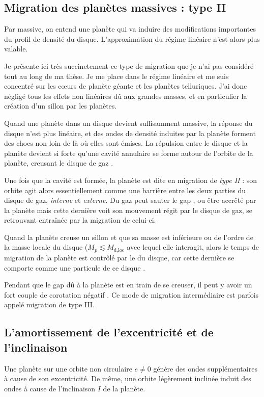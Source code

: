 \subsection{Migration des planètes massives : type II}
Par massive, on entend une planète qui va induire des modifications importantes du profil de densité du disque. L'approximation du régime linéaire n'est alors plus valable. 

Je présente ici très succinctement ce type de migration que je n'ai pas considéré tout au long de ma thèse. Je me place dans le régime linéaire et me suis concentré sur les cœurs de planète géante et les planètes telluriques. J'ai donc négligé tous les effets non linéaires dû aux grandes masses, et en particulier la création d'un sillon par les planètes.

\bigskip

Quand une planète dans un disque devient suffisamment massive, la réponse du disque n'est plus linéaire, et des ondes de densité induites par la planète forment des chocs non loin de là où elles sont émises. La répulsion entre le disque et la planète devient si forte qu'une cavité annulaire se forme autour de l'orbite de la planète, creusant le disque de gaz \citep{lin1986tidal}.

Une fois que la cavité est formée, la planète est dite en migration de \emph{type II} : son orbite agit alors essentiellement comme une barrière entre les deux parties du disque de gaz, \emph{interne} et \emph{externe}. Du gaz peut sauter le gap \citep{lubow2006gas}, ou être accrêté par la planète mais cette dernière voit son mouvement régit par le disque de gaz, se retrouvant entraînée par la migration de celui-ci.

Quand la planète creuse un sillon et que sa masse est inférieure ou de l'ordre de la masse locale du disque ($M_p \lesssim M_\text{d,loc}$ avec lequel elle interagit, alors le temps de migration de la planète est contrôlé par le  du disque, car cette dernière se comporte comme une particule de ce disque \citep{nelson2000migration}.

\bigskip

Pendant que le gap dû à la planète est en train de se creuser, il peut y avoir un fort couple de corotation négatif \citep{masset2003runaway}. Ce mode de migration intermédiaire est parfois appelé migration de type III. 

\subsection{L'amortissement de l'excentricité et de l'inclinaison}%
Une planète sur une orbite non circulaire $e\neq 0$ génère des ondes supplémentaires à cause de son excentricité. De même, une orbite légèrement inclinée induit des ondes à cause de l'inclinaison $I$ de la planète. 

